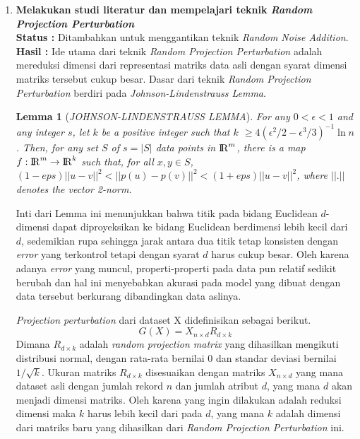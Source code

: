 \documentclass[a4paper,twoside]{article}
\begin{document}
\begin{enumerate}
		\item \textbf{Melakukan studi literatur dan mempelajari teknik \textit{Random Projection Perturbation}} \\
		{\bf Status :} Ditambahkan untuk menggantikan teknik \textit{Random Noise Addition}.\\
		{\bf Hasil :} Ide utama dari teknik \textit{Random Projection Perturbation} adalah mereduksi dimensi dari representasi matriks data asli dengan syarat dimensi matriks tersebut cukup besar. Dasar dari teknik \textit{Random Projection Perturbation} berdiri pada \textit{Johnson-Lindenstrauss Lemma}. 
		\newtheorem{theorem}{Lemma}
		\begin{theorem}[\textit{JOHNSON-LINDENSTRAUSS LEMMA}]
			For any \(0 < \epsilon < 1\) and any integer \(s\), let \(k\) be a positive integer such that \(k\) \(\geq 4(\epsilon^{2}/2-\epsilon^{3}/3)^{-1}\ln{n}\). Then, for any set \(S\) of \(s = |S|\) data points in \({\rm I\!R}^{m}\), there is a map \(f : {\rm I\!R}^{m} \rightarrow {\rm I\!R}^{k}\) such that, for all \(x, y \in S\), \((1-eps)||u - v||^{2}<||p(u) - p(v)||^{2}<(1+eps)||u - v||^{2}\), where \(||.||\) denotes the vector 2-norm.
		\end{theorem}
		Inti dari Lemma ini menunjukkan bahwa titik pada bidang Euclidean \(d\)-dimensi dapat diproyeksikan ke bidang Euclidean berdimensi lebih kecil dari \(d\), sedemikian rupa sehingga jarak antara dua titik tetap konsisten dengan \textit{error} yang terkontrol tetapi dengan syarat \(d\) harus cukup besar. Oleh karena adanya \textit{error} yang muncul, properti-properti pada data pun relatif sedikit berubah dan hal ini menyebabkan akurasi pada model yang dibuat dengan data tersebut berkurang dibandingkan data aslinya.
		
		\textit{Projection perturbation} dari dataset X didefinisikan sebagai berikut.
		\begin{equation}
			G(X) = X_{n \times d} R_{d \times k}
		\end{equation}
		Dimana \(R_{d \times k}\) adalah \textit{random projection matrix} yang dihasilkan mengikuti distribusi normal, dengan rata-rata bernilai 0 dan standar deviasi bernilai \(1/\sqrt{k}\). Ukuran matriks \(R_{d \times k}\) disesuaikan dengan matriks \(X_{n \times d}\) yang mana dataset asli dengan jumlah rekord \(n\) dan jumlah atribut \(d\), yang mana \(d\) akan menjadi dimensi matriks. Oleh karena yang ingin dilakukan adalah reduksi dimensi maka \(k\) harus lebih kecil dari pada \(d\), yang mana \(k\) adalah dimensi dari matriks baru yang dihasilkan dari \textit{Random Projection Perturbation} ini.
		

\end{enumerate}
\end{document}
